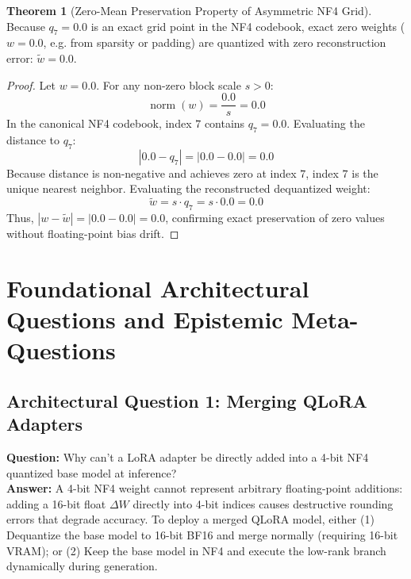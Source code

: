 \documentclass[11pt,a4paper]{article}
\theoremstyle{definition}
\newtheorem{theorem}{\textbf{Theorem}}[section]
\begin{document}
\begin{theorem}[Zero-Mean Preservation Property of Asymmetric NF4 Grid]
Because $q_7 = 0.0$ is an exact grid point in the NF4 codebook, exact zero weights ($w = 0.0$, e.g. from sparsity or padding) are quantized with zero reconstruction error: $\tilde{w} = 0.0$.
\end{theorem}

\begin{proof}
Let $w = 0.0$. For any non-zero block scale $s > 0$:
{\boldmath
\begin{equation}
\operatorname{norm}(w) = \frac{0.0}{s} = 0.0
\end{equation}
}
In the canonical NF4 codebook, index $7$ contains $q_7 = 0.0$.
Evaluating the distance to $q_7$:
{\boldmath
\begin{equation}
|0.0 - q_7| = |0.0 - 0.0| = 0.0
\end{equation}
}
Because distance is non-negative and achieves zero at index $7$, index $7$ is the unique nearest neighbor.
Evaluating the reconstructed dequantized weight:
{\boldmath
\begin{equation}
\tilde{w} = s \cdot q_7 = s \cdot 0.0 = 0.0
\end{equation}
}
Thus, $|w - \tilde{w}| = |0.0 - 0.0| = 0.0$, confirming exact preservation of zero values without floating-point bias drift.
\end{proof}

\section{Foundational Architectural Questions and Epistemic Meta-Questions}

\subsection{Architectural Question 1: Merging QLoRA Adapters}
\textbf{Question:} Why can't a LoRA adapter be directly added into a 4-bit NF4 quantized base model at inference?\\
\textbf{Answer:} A 4-bit NF4 weight cannot represent arbitrary floating-point additions: adding a 16-bit float $\Delta W$ directly into 4-bit indices causes destructive rounding errors that degrade accuracy. To deploy a merged QLoRA model, either (1) Dequantize the base model to 16-bit BF16 and merge normally (requiring 16-bit VRAM); or (2) Keep the base model in NF4 and execute the low-rank branch dynamically during generation.
\end{document}
